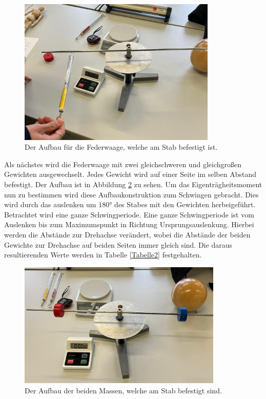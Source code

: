 \begin{flushleft}
    \begin{figure}
        \centering
        \includegraphics[height=70mm]{bilder/federwaage.jpeg}
        \caption{Der Aufbau für die Federwaage, welche am Stab befestigt ist. \label{Abbildung2}}
    \end{figure}

    \newpage

    Als nächstes wird die Federwaage mit zwei gleichschweren und gleichgroßen Gewichten ausgewechselt. 
    Jedes Gewicht wird auf einer Seite im selben Abstand befestigt. 
    Der Aufbau ist in Abbildung \ref{Abbildung3} zu sehen.
    Um das Eigenträgheitsmoment nun zu bestimmen wird diese Aufbaukonstruktion zum Schwingen gebracht. 
    Dies wird durch das auslenken um $180 \unit{\degree}$ des Stabes mit den Gewichten herbeigeführt. 
    Betrachtet wird eine ganze Schwingperiode. Eine ganze Schwingperiode ist vom Auslenken bis zum Maximumspunkt in Richtung Ursprungsauslenkung. 
    Hierbei werden die Abstände zur Drehachse verändert, wobei die Abstände der beiden Gewichte zur Drehachse auf beiden Seiten immer gleich sind. 
    Die daraus resultierenden Werte werden in Tabelle \ref{Tabelle2} festgehalten.  \\


    \begin{figure}
        \centering
        \includegraphics[height=60mm]{bilder/gewicht.jpeg}
        \caption{Der Aufbau der beiden Massen, welche am Stab befestigt sind. \label{Abbildung3}}
    \end{figure}


\end{flushleft}
